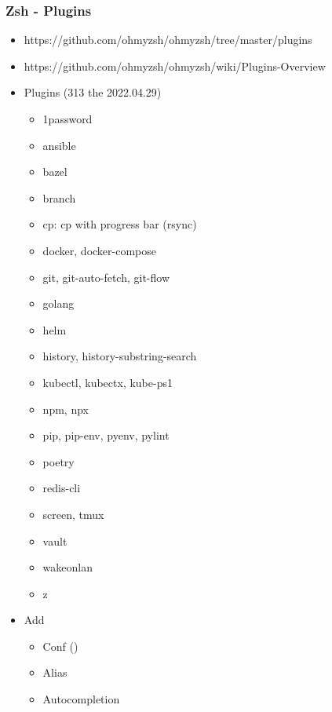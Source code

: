 \subsubsection{Zsh - Plugins}
\begin{frame}[fragile]{\subsubsecname}
  \begin{itemize}
    \item https://github.com/ohmyzsh/ohmyzsh/tree/master/plugins
    \item https://github.com/ohmyzsh/ohmyzsh/wiki/Plugins-Overview
    \item Plugins (313 the 2022.04.29)
      \begin{itemize}
        \item 1password
        \item ansible
        \item bazel
        \item branch
        \item cp: cp with progress bar (rsync)
        \item docker, docker-compose
        \item git, git-auto-fetch, git-flow
        \item golang
        \item helm
        \item history, history-substring-search
        \item kubectl, kubectx, kube-ps1
        \item npm, npx
        \item pip, pip-env, pyenv, pylint
        \item poetry
        \item redis-cli
        \item screen, tmux
        \item vault
        \item wakeonlan
        \item z
      \end{itemize}
    \item Add
      \begin{itemize}
        \item Conf ()
        \item Alias
        \item Autocompletion
      \end{itemize}
  \end{itemize}
\end{frame}
